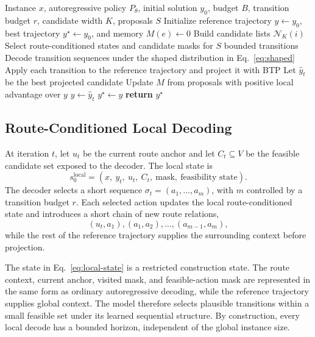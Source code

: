 \documentclass[11pt]{article}
\newcommand{\BTP}{\textsc{BTP}}
\newcommand{\method}{\textsc{STAR}}
\newcommand{\cN}{\mathcal{N}}
\newcommand{\cost}{C}
\begin{document}
\begin{algorithm}[t]
\caption{\method{} inference with a fixed autoregressive policy.}
\label{alg:star}
\small
\begin{algorithmic}[1]
\REQUIRE Instance $x$, autoregressive policy $P_\theta$, initial solution $y_0$, budget $B$, transition budget $r$, candidate width $K$, proposals $S$
\STATE Initialize reference trajectory $y \leftarrow y_0$, best trajectory $y^\star \leftarrow y_0$, and memory $M(e)\leftarrow 0$
\STATE Build candidate lists $\cN_K(i)$
    \STATE Select route-conditioned states and candidate masks for $S$ bounded transitions
    \STATE Decode transition sequences under the shaped distribution in Eq.~\eqref{eq:shaped}
    \STATE Apply each transition to the reference trajectory and project it with \BTP{}
    \STATE Let $\hat y_t$ be the best projected candidate
    \STATE Update $M$ from proposals with positive local advantage over $y$
    \STATE $y\leftarrow \hat y_t$
    \IF{$\cost_x(y)<\cost_x(y^\star)$}
        \STATE $y^\star\leftarrow y$
    \ENDIF
\ENDFOR
\STATE \textbf{return} $y^\star$
\end{algorithmic}
\end{algorithm}

\subsection{Route-Conditioned Local Decoding}

At iteration $t$, let $u_t$ be the current route anchor and let $C_t\subseteq V$ be the feasible candidate set exposed to the decoder. The local state is
\begin{equation}
  s^{\mathrm{local}}_0=(x,\ y_t,\ u_t,\ C_t,\ \text{mask},\ \text{feasibility state}).
  \label{eq:local-state}
\end{equation}
The decoder selects a short sequence $\sigma_t=(a_1,\ldots,a_m)$, with $m$ controlled by a transition budget $r$. Each selected action updates the local route-conditioned state and introduces a short chain of new route relations,
\begin{equation}
  (u_t,a_1),(a_1,a_2),\ldots,(a_{m-1},a_m),
  \label{eq:splice}
\end{equation}
while the rest of the reference trajectory supplies the surrounding context before projection.

The state in Eq.~\eqref{eq:local-state} is a restricted construction state. The route context, current anchor, visited mask, and feasible-action mask are represented in the same form as ordinary autoregressive decoding, while the reference trajectory supplies global context. The model therefore selects plausible transitions within a small feasible set under its learned sequential structure. By construction, every local decode has a bounded horizon, independent of the global instance size.
\end{document}
